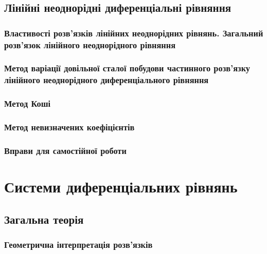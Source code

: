 	\subsection{Лінійні неоднорідні диференціальні рівняння}
	

		\subsubsection{Властивості розв’язків лінійних неоднорідних рівнянь. Загальний розв’язок лінійного неоднорідного рівняння}
		

		\subsubsection{Метод варіації довільної сталої побудови частинного роз\-в'яз\-ку лінійного неоднорідного диференціального рівняння}
		

		\subsubsection{Метод Коші}
		

		\subsubsection{Метод невизначених коефіцієнтів}
		

		\subsubsection{Вправи для самостійної роботи}
		

\section{Системи диференціальних рівнянь}


	\subsection{Загальна теорія}
	

		\subsubsection{Геометрична інтерпретація розв'язків}
		

